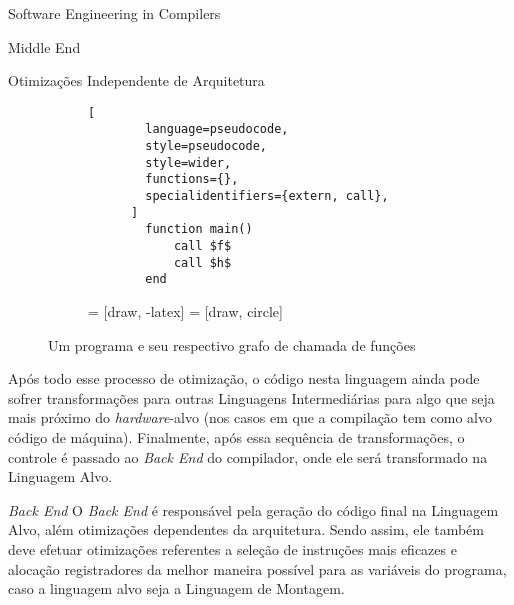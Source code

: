 \begin{section}{Software Engineering in Compilers}
\begin{subsection}{Middle End}
\begin{subsubsection}{Otimizações Independente de Arquitetura}
\begin{figure}[ht]
\begin{subfigure}[b]{0.40\textwidth}
\begin{lstlisting}[
        language=pseudocode,
        style=pseudocode,
        style=wider,
        functions={},
        specialidentifiers={extern, call},
      ]
        function main()
            call $f$
            call $h$
        end
      \end{lstlisting}
  \end{subfigure}
  \begin{subfigure}[b]{0.40\textwidth}
     = [draw, -latex]
     = [draw, circle]
    \begin{center}
    \end{center}
  \end{subfigure}
  \caption{Um programa e seu respectivo grafo de chamada de funções}
  \label{fig:call_graph}
\end{figure}
    Após todo esse processo de otimização, o código nesta linguagem ainda
pode sofrer transformações para outras Linguagens
Intermediárias para algo que seja mais próximo do
\textit{hardware}-alvo (nos casos em que a compilação tem como alvo código de máquina).
Finalmente, após essa sequência de transformações, o controle é
passado ao \textit{Back End} do compilador, onde ele será transformado na
Linguagem Alvo.

\end{subsubsection}

\end{subsection}

\begin{subsection}{\textit{Back End}}
    O \textit{Back End} é responsável pela geração do código final na
Linguagem Alvo, além otimizações dependentes da arquitetura. Sendo assim,
ele também deve efetuar otimizações referentes
a seleção de instruções mais eficazes e alocação registradores
da melhor maneira possível para as variáveis do programa, caso a linguagem alvo
seja a Linguagem de Montagem.


\end{subsection}
\end{section}
